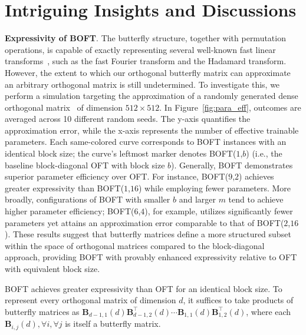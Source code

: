 \section{Intriguing Insights and Discussions}

\textbf{Expressivity of BOFT}. The butterfly structure, together with permutation operations, is capable of exactly representing several well-known fast linear transforms~\cite{dao2019learning,dao2019kaleidoscope}, such as the fast Fourier transform and the Hadamard transform. However, the extent to which our orthogonal butterfly matrix can approximate an arbitrary orthogonal matrix is still undetermined. To investigate this, we perform a simulation targeting the approximation of a randomly generated dense orthogonal matrix~\cite{anderson1987generation} of dimension $512\times 512$. In Figure~\ref{fig:para_eff}, outcomes are averaged across 10 different random seeds. The y-axis quantifies the approximation error, while the x-axis represents the number of effective trainable parameters. Each same-colored curve corresponds to BOFT instances with an identical block size; the curve’s leftmost marker denotes BOFT($1$,$b$) (i.e., the baseline block-diagonal OFT with block size $b$). Generally, BOFT demonstrates superior parameter efficiency over OFT. For instance, BOFT($9$,$2$) achieves greater expressivity than BOFT($1$,$16$) while employing fewer parameters. More broadly, configurations of BOFT with smaller $b$ and larger $m$ tend to achieve higher parameter efficiency; BOFT($6$,$4$), for example, utilizes significantly fewer parameters yet attains an approximation error comparable to that of BOFT($2$,$16$). These results suggest that butterfly matrices define a more structured subset within the space of orthogonal matrices compared to the block-diagonal approach, providing BOFT with provably enhanced expressivity relative to OFT with equivalent block size.

\begin{theorem}\label{thm:exp_boft}
    BOFT achieves greater expressivity than OFT for an identical block size. To represent every orthogonal matrix of dimension $d$, it suffices to take products of butterfly matrices as $\bm{B}_{d-1,1}(d)\bm{B}^\top_{d-1,2}(d)\cdots\bm{B}_{1,1}(d)\bm{B}^\top_{1,2}(d)$, where each $\bm{B}_{i,j}(d),\forall i,\forall j$ is itself a butterfly matrix.
\end{theorem}


